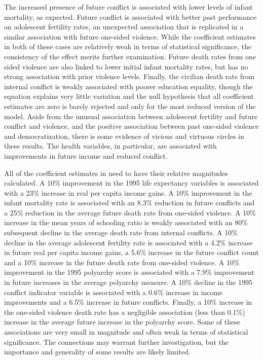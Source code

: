 \documentclass[12pt]{article}
\begin{document}


The increased presence of future conflict is associated with lower levels of infant mortality, as expected. Future conflict is associated with better past performance on adolescent fertility rates, an unexpected association that is replicated in a similar association with future one-sided violence. While the coefficient estimates in both of these cases are relatively weak in terms of statistical significance, the consistency of the effect merits further examination. Future death rates from one sided violence are also linked to lower initial infant mortality rates, but has no strong association with prior violence levels. Finally, the civilian death rate from internal conflict is weakly associated with poorer education equality, though the equation explains very little variation and the null hypothesis that all coefficient estimates are zero is barely rejected and only for the most reduced version of the model. Aside from the unusual association between adolescent fertility and future conflict and violence, and the positive association between past one-sided violence and democratization, there is some evidence of vicious and virtuous circles in these results. The health variables, in particular, are associated with improvements in future income and reduced conflict.

All of the coefficient estimates in  need to have their relative magnitudes calculated. A 10\% improvement in the 1995 life expectancy variables is associated with a 23\% increase in real per capita income gains. A 10\% improvement in the infant mortality rate is associated with an 8.3\% reduction in future conflicts and a 25\% reduction in the average future death rate from one-sided violence. A 10\% increase in the mean years of schooling ratio is weakly associated with an 80\% subsequent decline in the average death rate from internal conflicts. A 10\% decline in the average adolescent fertility rate is associated with a 4.2\% increase in future real per capita income gains, a 5.6\% increase in the future conflict count and a 10\% increase in the future death rate from one-sided violence.  A 10\% improvement in the 1995 polyarchy score is associated with a 7.9\% improvement in future increases in the average polyarchy measure. A 10\% decline in the 1995 conflict indicator variable is associated with a 0.6\% increase in income improvements and a 6.5\% increase in future conflicts. Finally, a 10\% increase in the one-sided violence death rate has a negligible association (less than 0.1\%) increase in the average future increase in the polyarchy score.  Some of these associations are very small in magnitude and often weak in terms of statistical significance. The connections may warrant further investigation, but the importance and generality of some results are likely limited.
\end{document}
